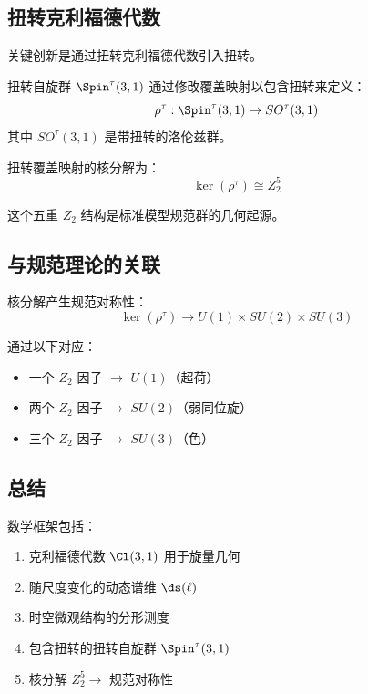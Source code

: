 \subsection{扭转克利福德代数}

关键创新是通过扭转克利福德代数引入扭转。

\begin{definition}[扭转自旋群]
扭转自旋群 $\Spin^\tau(3,1)$ 通过修改覆盖映射以包含扭转来定义：
\begin{equation}
    \rho^\tau: \Spin^\tau(3,1) \to SO^\tau(3,1)
\end{equation}
其中 $SO^\tau(3,1)$ 是带扭转的洛伦兹群。
\end{definition}

\begin{theorem}[核分解]
扭转覆盖映射的核分解为：
\begin{equation}
    \ker(\rho^\tau) \cong Z_2^5
\end{equation}
\end{theorem}

这个五重 $Z_2$ 结构是标准模型规范群的几何起源。

\subsection{与规范理论的关联}

核分解产生规范对称性：
\begin{equation}
    \ker(\rho^\tau) \to U(1) \times SU(2) \times SU(3)
\end{equation}

通过以下对应：
\begin{itemize}
    \item 一个 $Z_2$ 因子 $\to$ $U(1)$（超荷）
    \item 两个 $Z_2$ 因子 $\to$ $SU(2)$（弱同位旋）
    \item 三个 $Z_2$ 因子 $\to$ $SU(3)$（色）
\end{itemize}

\subsection{总结}

数学框架包括：
\begin{enumerate}
    \item 克利福德代数 $\Cl(3,1)$ 用于旋量几何
    \item 随尺度变化的动态谱维 $\ds(\ell)$
    \item 时空微观结构的分形测度
    \item 包含扭转的扭转自旋群 $\Spin^\tau(3,1)$
    \item 核分解 $Z_2^5 \to$ 规范对称性
\end{enumerate}

